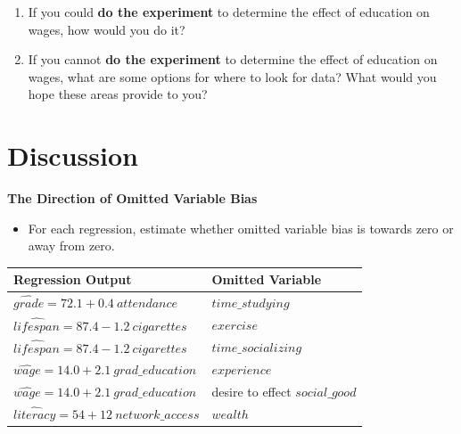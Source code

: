 \documentclass[
]{book}
\providecommand{\tightlist}{%
  \setlength{\itemsep}{0pt}\setlength{\parskip}{0pt}}
\theoremstyle{definition}
\theoremstyle{definition}
\theoremstyle{definition}
\theoremstyle{definition}
\theoremstyle{remark}
\begin{document}
\begin{enumerate}
\def\labelenumi{\arabic{enumi}.}
\tightlist
\item
  If you could \textbf{do the experiment} to determine the effect of education on wages, how would you do it?
\item
  If you cannot \textbf{do the experiment} to determine the effect of education on wages, what are some options for where to look for data? What would you hope these areas provide to you?
\end{enumerate}

\section{Discussion}\label{discussion-2}

\textbf{The Direction of Omitted Variable Bias}

\begin{itemize}
\tightlist
\item
  For each regression, estimate whether omitted variable bias is towards zero or away from zero.
\end{itemize}

\begin{longtable}[]{@{}
  >{\raggedright\arraybackslash}p{}
  >{\raggedright\arraybackslash}p{}@{}}
\toprule\noalign{}
\begin{minipage}[b]{\linewidth}\raggedright
Regression Output
\end{minipage} & \begin{minipage}[b]{\linewidth}\raggedright
Omitted Variable
\end{minipage} \\
\midrule\noalign{}
\endhead
\bottomrule\noalign{}
\endlastfoot
\(\widehat{grade} = 72.1 + 0.4\ attendance\) & \(time\_studying\) \\
\(\widehat{lifespan} = 87.4 - 1.2\ cigarettes\) & \(exercise\) \\
\(\widehat{lifespan} = 87.4 - 1.2\ cigarettes\) & \(time\_socializing\) \\
\(\widehat{wage} = 14.0 + 2.1\ grad\_education\) & \(experience\) \\
\(\widehat{wage} = 14.0 + 2.1\ grad\_education\) & desire to effect \(social\_good\) \\
\(\widehat{literacy} = 54 + 12\ network\_access\) & \(wealth\) \\
\end{longtable}
\end{document}

